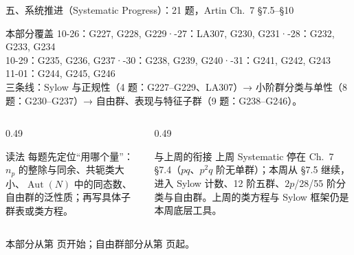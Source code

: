 \documentclass[aspectratio=169,10pt,fontset=none]{ctexbeamer}
\begin{document}
\begin{frame}[t]{五、系统推进（Systematic Progress）：21 题，Artin Ch.~7 \S7.5--\S10}
  \label{sec:sys}
  \begin{block}{\footnotesize 本部分覆盖}
    \scriptsize
    10-26：G227, G228, G229\quad·-27：LA307, G230, G231\quad·-28：G232, G233, G234\\
    10-29：G235, G236, G237\quad·-30：G238, G239, G240\quad·-31：G241, G242, G243\\
    11-01：G244, G245, G246\\[2pt]
    三条线：Sylow 与正规性（4 题：G227--G229、LA307）→ 小阶群分类与单性（8 题：G230--G237）→ 自由群、表现与特征子群（9 题：G238--G246）。
  \end{block}
  \begin{columns}[T,onlytextwidth]
    \begin{column}{0.49\textwidth}
      \begin{exampleblock}{\footnotesize 读法}
        \scriptsize
        每题先定位“用哪个量”：$n_p$ 的整除与同余、共轭类大小、$\operatorname{Aut}(N)$ 中的同态数、自由群的泛性质；再写具体子群表或类方程。
      \end{exampleblock}
    \end{column}
    \begin{column}{0.49\textwidth}
      \begin{block}{\footnotesize 与上周的衔接}
        \scriptsize
        上周 Systematic 停在 Ch.~7 \S7.4（$pq$、$p^2q$ 阶无单群）；本周从 \S7.5 继续，进入 Sylow 计数、12 阶五群、$2p$/28/55 阶分类与自由群。上周的类方程与 Sylow 框架仍是本周底层工具。
      \end{block}
    \end{column}
  \end{columns}
  \vspace{0.2em}
  {\scriptsize\color{ink!70} 本部分从第 \pageref{ex:G227} 页开始；自由群部分从第 \pageref{ex:G238} 页起。}
\end{frame}


\end{document}
